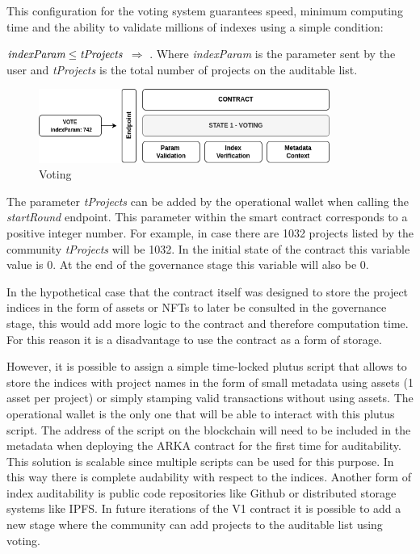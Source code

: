 \documentclass[12pt]{article}
\begin{document}
This configuration for the voting system guarantees speed, minimum computing time and the ability to validate millions of indexes using a simple condition:

$\emph{indexParam} \leq \emph{tProjects}$  $\Rightarrow$ . Where \emph{indexParam} is the parameter sent by the user and \emph{tProjects} is the total number of projects on the auditable list.

\begin{figure}[ht]
  \centering
  \includegraphics[width=0.85\textwidth]{vote.png}
  \caption{Voting
  }
  \label{fig:mi_imagen}
\end{figure}

The parameter \emph{tProjects} can be added by the operational wallet when calling the \emph{startRound} endpoint. This parameter within the smart contract corresponds to a positive integer number. For example, in case there are 1032 projects listed by the community \emph{tProjects} will be 1032. In the initial state of the contract this variable value is 0. At the end of the governance stage this variable will also be 0.

In the hypothetical case that the contract itself was designed to store the project indices in the form of assets or NFTs to later be consulted in the governance stage, this would add more logic to the contract and therefore computation time. For this reason it is a disadvantage to use the contract as a form of storage.

However, it is possible to assign a simple time-locked plutus script that allows to store the indices with project names in the form of small metadata using assets (1 asset per project) or simply stamping valid transactions without using assets. The operational wallet is the only one that will be able to interact with this plutus script. The address of the script on the blockchain will need to be included in the metadata when deploying the ARKA contract for the first time for auditability. This solution is scalable since multiple scripts can be used for this purpose. In this way there is complete audability with respect to the indices. Another form of index auditability is public code repositories like Github or distributed storage systems like IPFS. In future iterations of the V1 contract it is possible to add a new stage where the community can add projects to the auditable list using voting.
\end{document}
